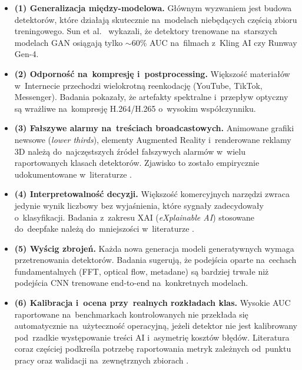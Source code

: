 \begin{itemize}
  \item \textbf{(1) Generalizacja mi\k{e}dzy-modelowa.}
    G\l{}\'{o}wnym wyzwaniem jest budowa detektor\'{o}w, kt\'{o}re dzia\l{}aj\k{a}
skutecznie na~modelach nieb\k{e}d\k{a}cych cz\k{e}\'{s}ci\k{a} zbioru treningowego.
    Sun et al.\ \cite{Sun2024GenVideo} wykazali, \.{z}e detektory
    trenowane na~starszych modelach GAN osi\k{a}gaj\k{a} tylko
    $\sim$60\% AUC na~filmach z~Kling AI czy Runway Gen-4.

  \item \textbf{(2) Odporno\'{s}\'{c} na~kompresj\k{e} i~postprocessing.}
Wi\k{e}kszo\'{s}\'{c} materia\l{}\'{o}w w~Internecie przechodzi wielokrotn\k{a}
reenkodacj\k{e} (YouTube, TikTok, Messenger). Badania
\cite{Caldelli2021OpticalFlowCNN, Nassif2022ImprovedOpticalFlow}
pokaza\l{}y, \.{z}e artefakty spektralne i~przep\l{}yw optyczny s\k{a}
wra\.{z}liwe na~kompresj\k{e} H.264/H.265 o~wysokim wsp\'{o}\l{}czynniku.

  \item \textbf{(3) Fa\l{}szywe alarmy na~tre\'{s}ciach broadcastowych.}
    Animowane grafiki newsowe (\textit{lower thirds}), elementy
    Augmented Reality i~renderowane reklamy 3D nale\.{z}\k{a} do~najcz\k{e}stszych
    \'{z}r\'{o}de\l{} fa\l{}szywych alarm\'{o}w w~wielu raportowanych klasach detektor\'{o}w.
    Zjawisko to zostało empirycznie udokumentowane w~literaturze \cite{Wang2024ReliabilityPerspective}.

  \item \textbf{(4) Interpretowalno\'{s}\'{c} decyzji.}
Wi\k{e}kszo\'{s}\'{c} komercyjnych narz\k{e}dzi zwraca jedynie wynik liczbowy
bez wyja\'{s}nienia, kt\'{o}re sygna\l{}y zadecydowa\l{}y o~klasyfikacji.
Badania z~zakresu XAI (\textit{eXplainable AI}) stosowane do~deepfake
nale\.{z}\k{a} do~mniejszo\'{s}ci w~literaturze \cite{Khan2025ComprehensiveSurvey}.

  \item \textbf{(5) Wy\'{s}cig zbroje\'{n}.}
    Każda nowa generacja modeli generatywnych wymaga przetrenowania
    detektor\'{o}w. Badania \cite{Li2025AIGCSurvey} sugeruj\k{a},
    \.{z}e podej\'{s}cia oparte na~cechach fundamentalnych (FFT, optical flow,
    metadane) s\k{a} bardziej trwa\l{}e ni\.{z} podej\'{s}cia CNN trenowane
    end-to-end na~konkretnych modelach.

  \item \textbf{(6) Kalibracja i~ocena przy~realnych rozk\l{}adach klas.}
    Wysokie AUC raportowane na~benchmarkach kontrolowanych nie przekłada się
    automatycznie na~użyteczność operacyjną, jeżeli detektor nie jest kalibrowany
    pod~rzadkie występowanie treści AI i~asymetrię kosztów błędów.
    Literatura coraz częściej podkreśla potrzebę raportowania metryk zależnych
    od~punktu pracy oraz walidacji na~zewnętrznych zbiorach \cite{Wang2024ReliabilityPerspective,Sun2024GenVideo}.
\end{itemize}

